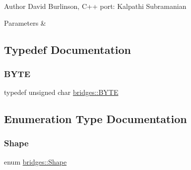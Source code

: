 \begin{DoxyAuthor}{Author}
David Burlinson, C++ port\+: Kalpathi Subramanian 
\end{DoxyAuthor}

\begin{DoxyParams}{Parameters}
{\em } & \\
\hline
\end{DoxyParams}


\subsection{Typedef Documentation}
\mbox{\label{namespacebridges_a59b77ee45243ba85c701fb8ab298ef00}} 
\subsubsection{\texorpdfstring{B\+Y\+TE}{BYTE}}
{\footnotesize\ttfamily typedef unsigned char \mbox{\hyperlink{namespacebridges_a59b77ee45243ba85c701fb8ab298ef00}{bridges\+::\+B\+Y\+TE}}}



\subsection{Enumeration Type Documentation}
\mbox{\label{namespacebridges_a1b4050586bd708782ae0d4f3b06b9579}} 
\subsubsection{\texorpdfstring{Shape}{Shape}}
{\footnotesize\ttfamily enum \mbox{\hyperlink{namespacebridges_a1b4050586bd708782ae0d4f3b06b9579}{bridges\+::\+Shape}}}

